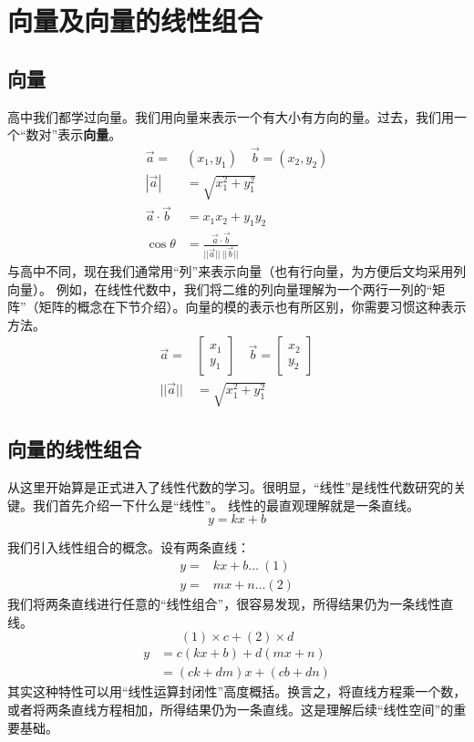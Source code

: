 \chapter{向量及向量的线性组合}

\section{向量}
高中我们都学过向量。我们用向量来表示一个有大小有方向的量。过去，我们用一个“数对”表示\textbf{向量}。
$$
\begin{aligned}
	\vec{a}=&(x_1,y_1)\quad \vec b=(x_2,y_2)\\
	|\vec a|&=\sqrt{x_1^2+y_1^2}\\
	\vec a\cdot\vec b&=x_1x_2+y_1y_2\\
	\cos\theta&=\frac{\vec a\cdot\vec b}{||\vec a||\ ||\vec b||}
\end{aligned}
$$
与高中不同，现在我们通常用“列”来表示向量（也有行向量，为方便后文均采用列向量）。
例如，在线性代数中，我们将二维的列向量理解为一个两行一列的“矩阵”（矩阵的概念在下节介绍）。向量的模的表示也有所区别，你需要习惯这种表示方法。
$$
\begin{aligned}
	\vec a=&\begin{bmatrix}x_1\\y_1\end{bmatrix}\quad
	\vec b=\begin{bmatrix}x_2\\y_2\end{bmatrix}\\
	||\vec a||&=\sqrt{x_1^2+y_1^2}
\end{aligned}
$$

\section{向量的线性组合}
从这里开始算是正式进入了线性代数的学习。很明显，“线性”是线性代数研究的关键。我们首先介绍一下什么是“线性”。
线性的最直观理解就是一条直线。
$$
y=kx+b
$$


我们引入线性组合的概念。设有两条直线：
$$
\begin{aligned}
	y=&kx+b\dots\ (1)\\
	y=&mx+n\dots(2)
\end{aligned}
$$
我们将两条直线进行任意的“线性组合”，很容易发现，所得结果仍为一条线性直线。
$$
(1)\times c+(2)\times d
$$
$$
\begin{aligned}
	y&=c(kx+b)+d(mx+n)\\
	&=(ck+dm)x+(cb+dn)
\end{aligned}
$$
其实这种特性可以用“线性运算封闭性”高度概括。换言之，将直线方程乘一个数，或者将两条直线方程相加，所得结果仍为一条直线。这是理解后续“线性空间”的重要基础。

